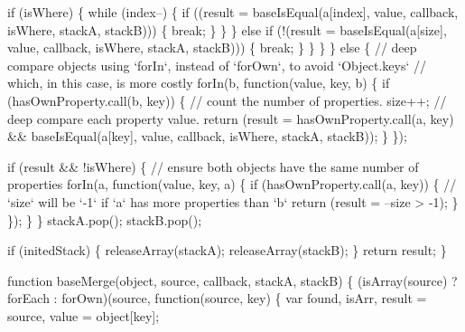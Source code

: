 \begin{DoxyCodeInclude}
            \textcolor{keywordflow}{if} (isWhere) \{
              \textcolor{keywordflow}{while} (index--) \{
                \textcolor{keywordflow}{if} ((result = baseIsEqual(a[index], value, callback, isWhere, stackA, stackB))) \{
                  \textcolor{keywordflow}{break};
                \}
              \}
            \} \textcolor{keywordflow}{else} \textcolor{keywordflow}{if} (!(result = baseIsEqual(a[size], value, callback, isWhere, stackA, stackB))) \{
              \textcolor{keywordflow}{break};
            \}
          \}
        \}
      \}
      \textcolor{keywordflow}{else} \{
        \textcolor{comment}{// deep compare objects using `forIn`, instead of `forOwn`, to avoid `Object.keys`}
        \textcolor{comment}{// which, in this case, is more costly}
        forIn(b, \textcolor{keyword}{function}(value, key, b) \{
          \textcolor{keywordflow}{if} (hasOwnProperty.call(b, key)) \{
            \textcolor{comment}{// count the number of properties.}
            size++;
            \textcolor{comment}{// deep compare each property value.}
            \textcolor{keywordflow}{return} (result = hasOwnProperty.call(a, key) && baseIsEqual(a[key], value, callback, isWhere, 
      stackA, stackB));
          \}
        \});

        \textcolor{keywordflow}{if} (result && !isWhere) \{
          \textcolor{comment}{// ensure both objects have the same number of properties}
          forIn(a, \textcolor{keyword}{function}(value, key, a) \{
            \textcolor{keywordflow}{if} (hasOwnProperty.call(a, key)) \{
              \textcolor{comment}{// `size` will be `-1` if `a` has more properties than `b`}
              \textcolor{keywordflow}{return} (result = --size > -1);
            \}
          \});
        \}
      \}
      stackA.pop();
      stackB.pop();

      \textcolor{keywordflow}{if} (initedStack) \{
        releaseArray(stackA);
        releaseArray(stackB);
      \}
      \textcolor{keywordflow}{return} result;
    \}

    \textcolor{keyword}{function} baseMerge(\textcolor{keywordtype}{object}, source, callback, stackA, stackB) \{
      (isArray(source) ? forEach : forOwn)(source, \textcolor{keyword}{function}(source, key) \{
        var found,
            isArr,
            result = source,
            value = \textcolor{keywordtype}{object}[key];


\end{DoxyCodeInclude}
